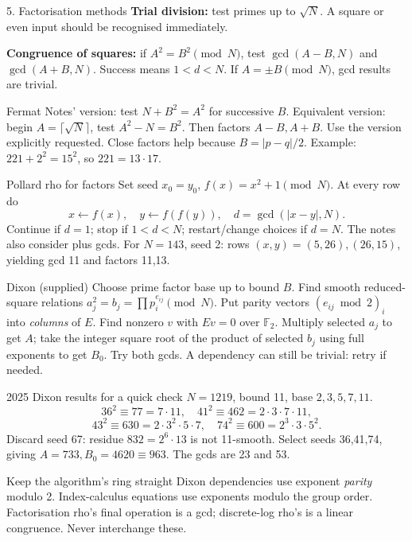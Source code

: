 \documentclass[11pt,a4paper]{article}
\newcommand{\F}{\mathbb F}\newcommand{\Z}{\mathbb Z}
\begin{document}
\clearpage
\begin{concept}{5. Factorisation methods}
\textbf{Trial division:} test primes up to \(\sqrt N\). A square or even input should be recognised immediately.

\textbf{Congruence of squares:} if \(A^2=B^2\pmod N\), test \(\gcd(A-B,N)\) and \(\gcd(A+B,N)\). Success means \(1<d<N\). If \(A=\pm B\pmod N\), gcd results are trivial.
\end{concept}
\begin{method}{Fermat}
Notes' version: test \(N+B^2=A^2\) for successive \(B\). Equivalent version: begin \(A=\lceil\sqrt N\rceil\), test \(A^2-N=B^2\). Then factors \(A-B,A+B\). Use the version explicitly requested. Close factors help because \(B=|p-q|/2\). Example: \(221+2^2=15^2\), so \(221=13\cdot17\).
\end{method}
\begin{method}{Pollard rho for factors}
Set seed \(x_0=y_0\), \(f(x)=x^2+1\pmod N\). At every row do
\[x\leftarrow f(x),\quad y\leftarrow f(f(y)),\quad d=\gcd(|x-y|,N).\]
Continue if \(d=1\); stop if \(1<d<N\); restart/change choices if \(d=N\). The notes also consider plus gcds. For \(N=143\), seed 2: rows \((x,y)=(5,26),(26,15)\), yielding gcd 11 and factors 11,13.
\end{method}
\begin{method}{Dixon (supplied)}
Choose prime factor base up to bound \(B\). Find smooth reduced-square relations \(a_j^2=b_j=\prod p_i^{e_{ij}}\pmod N\). Put parity vectors \((e_{ij}\bmod2)_i\) into \emph{columns} of \(E\). Find nonzero \(v\) with \(Ev=0\) over \(\F_2\). Multiply selected \(a_j\) to get \(A\); take the integer square root of the product of selected \(b_j\) using full exponents to get \(B_0\). Try both gcds. A dependency can still be trivial: retry if needed.
\end{method}
\begin{example}{2025 Dixon results for a quick check}
\(N=1219\), bound 11, base \(2,3,5,7,11\).
\[36^2\equiv77=7\cdot11,\quad41^2\equiv462=2\cdot3\cdot7\cdot11,\]
\[43^2\equiv630=2\cdot3^2\cdot5\cdot7,\quad74^2\equiv600=2^3\cdot3\cdot5^2.\]
Discard seed 67: residue \(832=2^6\cdot13\) is not 11-smooth. Select seeds 36,41,74, giving \(A=733,B_0=4620\equiv963\). The gcds are 23 and 53.
\end{example}
\begin{tip}{Keep the algorithm's ring straight}
Dixon dependencies use exponent \emph{parity} modulo 2. Index-calculus equations use exponents modulo the group order. Factorisation rho's final operation is a gcd; discrete-log rho's is a linear congruence. Never interchange these.
\end{tip}
\end{document}
